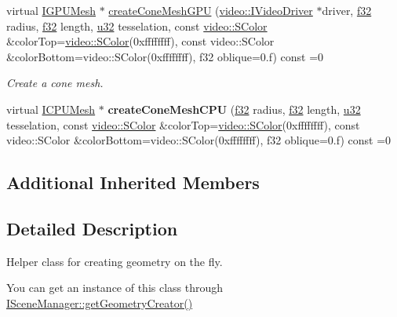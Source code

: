 \begin{DoxyCompactItemize}
\item 
virtual \hyperlink{classirr_1_1scene_1_1IMesh}{I\+G\+P\+U\+Mesh} $\ast$ \hyperlink{classirr_1_1scene_1_1IGeometryCreator_ad977d1ab6a7d9f839d47e4dc2b50d756}{create\+Cone\+Mesh\+G\+PU} (\hyperlink{classirr_1_1video_1_1IVideoDriver}{video\+::\+I\+Video\+Driver} $\ast$driver, \hyperlink{namespaceirr_a0277be98d67dc26ff93b1a6a1d086b07}{f32} radius, \hyperlink{namespaceirr_a0277be98d67dc26ff93b1a6a1d086b07}{f32} length, \hyperlink{namespaceirr_a0416a53257075833e7002efd0a18e804}{u32} tesselation, const \hyperlink{classirr_1_1video_1_1SColor}{video\+::\+S\+Color} \&color\+Top=\hyperlink{classirr_1_1video_1_1SColor}{video\+::\+S\+Color}(0xffffffff), const video\+::\+S\+Color \&color\+Bottom=video\+::\+S\+Color(0xffffffff), f32 oblique=0.\+f) const  =0
\begin{DoxyCompactList}\small\item\em Create a cone mesh. \end{DoxyCompactList}\item 
virtual \hyperlink{classirr_1_1scene_1_1IMesh}{I\+C\+P\+U\+Mesh} $\ast$ {\bfseries create\+Cone\+Mesh\+C\+PU} (\hyperlink{namespaceirr_a0277be98d67dc26ff93b1a6a1d086b07}{f32} radius, \hyperlink{namespaceirr_a0277be98d67dc26ff93b1a6a1d086b07}{f32} length, \hyperlink{namespaceirr_a0416a53257075833e7002efd0a18e804}{u32} tesselation, const \hyperlink{classirr_1_1video_1_1SColor}{video\+::\+S\+Color} \&color\+Top=\hyperlink{classirr_1_1video_1_1SColor}{video\+::\+S\+Color}(0xffffffff), const video\+::\+S\+Color \&color\+Bottom=video\+::\+S\+Color(0xffffffff), f32 oblique=0.\+f) const  =0\hypertarget{classirr_1_1scene_1_1IGeometryCreator_a78035212f111bc622b640508c9e65b54}{}\label{classirr_1_1scene_1_1IGeometryCreator_a78035212f111bc622b640508c9e65b54}

\end{DoxyCompactItemize}
\subsection*{Additional Inherited Members}


\subsection{Detailed Description}
Helper class for creating geometry on the fly. 

You can get an instance of this class through \hyperlink{classirr_1_1scene_1_1ISceneManager_aa907bfdd82887a9855157fdfb41985e0}{I\+Scene\+Manager\+::get\+Geometry\+Creator()} 

